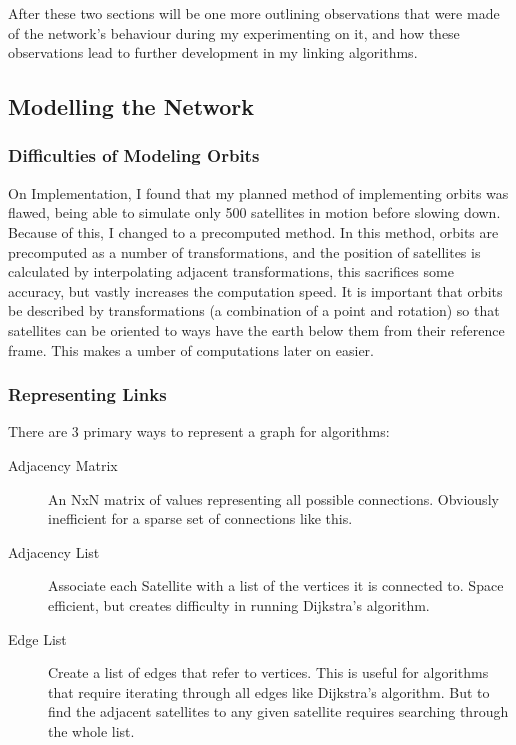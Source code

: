 \documentclass[12pt]{article}
\begin{document}
After these two sections will be one more outlining observations that were made of the network's behaviour during my experimenting on it, and how these observations lead to further development in my linking algorithms.

\subsection{Modelling the Network}

\subsubsection{Difficulties of Modeling Orbits}
On Implementation, I found that my planned method of implementing orbits was flawed, being able to simulate only 500 satellites in motion before slowing down. Because of this, I changed to a precomputed method. In this method, orbits are precomputed as a number of transformations, and the position of satellites is calculated by interpolating adjacent transformations, this sacrifices some accuracy, but vastly increases the computation speed. It is important that orbits be described by transformations (a combination of a point and rotation) so that satellites can be oriented to ways have the earth below them from their reference frame. This makes a umber of computations later on easier.

\subsubsection{Representing Links}
There are 3 primary ways to represent a graph for algorithms:

\begin{description}
\item[Adjacency Matrix] An NxN matrix of values representing all possible connections. Obviously inefficient for a sparse set of connections like this.
\item[Adjacency List] Associate each Satellite with a list of the vertices it is connected to. Space efficient, but creates difficulty in running Dijkstra's algorithm.
\item[Edge List] Create a list of edges that refer to vertices. This is useful for algorithms that require iterating through all edges like Dijkstra's algorithm. But to find the adjacent satellites to any given satellite requires searching through the whole list.
\end{description}
\end{document}
